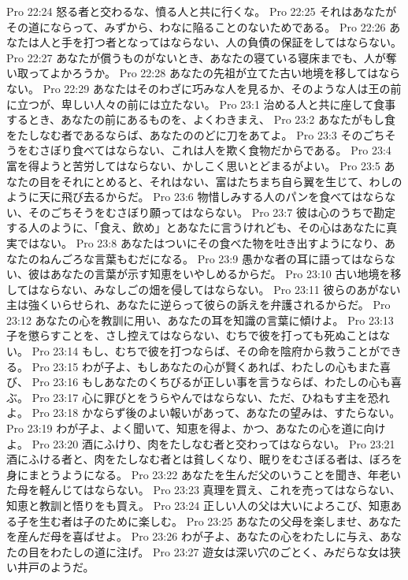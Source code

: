 Pro 22:24  怒る者と交わるな、憤る人と共に行くな。
Pro 22:25  それはあなたがその道にならって、みずから、わなに陥ることのないためである。
Pro 22:26  あなたは人と手を打つ者となってはならない、人の負債の保証をしてはならない。
Pro 22:27  あなたが償うものがないとき、あなたの寝ている寝床までも、人が奪い取ってよかろうか。
Pro 22:28  あなたの先祖が立てた古い地境を移してはならない。
Pro 22:29  あなたはそのわざに巧みな人を見るか、そのような人は王の前に立つが、卑しい人々の前には立たない。
Pro 23:1  治める人と共に座して食事するとき、あなたの前にあるものを、よくわきまえ、
Pro 23:2  あなたがもし食をたしなむ者であるならば、あなたののどに刀をあてよ。
Pro 23:3  そのごちそうをむさぼり食べてはならない、これは人を欺く食物だからである。
Pro 23:4  富を得ようと苦労してはならない、かしこく思いとどまるがよい。
Pro 23:5  あなたの目をそれにとめると、それはない、富はたちまち自ら翼を生じて、わしのように天に飛び去るからだ。
Pro 23:6  物惜しみする人のパンを食べてはならない、そのごちそうをむさぼり願ってはならない。
Pro 23:7  彼は心のうちで勘定する人のように、「食え、飲め」とあなたに言うけれども、その心はあなたに真実ではない。
Pro 23:8  あなたはついにその食べた物を吐き出すようになり、あなたのねんごろな言葉もむだになる。
Pro 23:9  愚かな者の耳に語ってはならない、彼はあなたの言葉が示す知恵をいやしめるからだ。
Pro 23:10  古い地境を移してはならない、みなしごの畑を侵してはならない。
Pro 23:11  彼らのあがない主は強くいらせられ、あなたに逆らって彼らの訴えを弁護されるからだ。
Pro 23:12  あなたの心を教訓に用い、あなたの耳を知識の言葉に傾けよ。
Pro 23:13  子を懲らすことを、さし控えてはならない、むちで彼を打っても死ぬことはない。
Pro 23:14  もし、むちで彼を打つならば、その命を陰府から救うことができる。
Pro 23:15  わが子よ、もしあなたの心が賢くあれば、わたしの心もまた喜び、
Pro 23:16  もしあなたのくちびるが正しい事を言うならば、わたしの心も喜ぶ。
Pro 23:17  心に罪びとをうらやんではならない、ただ、ひねもす主を恐れよ。
Pro 23:18  かならず後のよい報いがあって、あなたの望みは、すたらない。
Pro 23:19  わが子よ、よく聞いて、知恵を得よ、かつ、あなたの心を道に向けよ。
Pro 23:20  酒にふけり、肉をたしなむ者と交わってはならない。
Pro 23:21  酒にふける者と、肉をたしなむ者とは貧しくなり、眠りをむさぼる者は、ぼろを身にまとうようになる。
Pro 23:22  あなたを生んだ父のいうことを聞き、年老いた母を軽んじてはならない。
Pro 23:23  真理を買え、これを売ってはならない、知恵と教訓と悟りをも買え。
Pro 23:24  正しい人の父は大いによろこび、知恵ある子を生む者は子のために楽しむ。
Pro 23:25  あなたの父母を楽しませ、あなたを産んだ母を喜ばせよ。
Pro 23:26  わが子よ、あなたの心をわたしに与え、あなたの目をわたしの道に注げ。
Pro 23:27  遊女は深い穴のごとく、みだらな女は狭い井戸のようだ。
